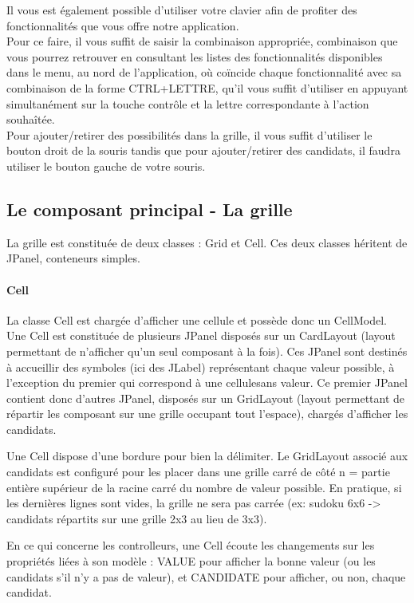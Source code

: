 Il vous est également possible d'utiliser votre clavier afin de profiter 
des fonctionnalités que vous offre notre application.\\
Pour ce faire, il vous suffit de saisir la combinaison appropriée, combinaison 
que vous pourrez retrouver en consultant les listes des fonctionnalités disponibles dans le menu, 
au nord de l'application, où coïncide chaque fonctionnalité avec sa combinaison 
de la forme CTRL+LETTRE, qu'il vous suffit d'utiliser en appuyant simultanément 
sur la touche contrôle et la lettre correspondante à l'action souhaîtée. \\

Pour ajouter/retirer des possibilités dans la grille, il vous suffit d'utiliser 
le bouton droit de la souris tandis que pour ajouter/retirer des candidats, il 
faudra utiliser le bouton gauche de votre souris.

\subsection{Le composant principal - La grille}

La grille est constituée de deux classes : Grid et Cell.
Ces deux classes héritent de JPanel, conteneurs simples.

\paragraph{Cell}
    
La classe Cell est chargée d'afficher une cellule et possède donc un CellModel.
Une Cell est constituée de plusieurs JPanel disposés sur un CardLayout (layout
permettant de n'afficher qu'un seul composant à la fois). Ces JPanel sont
destinés à accueillir des symboles (ici des JLabel) représentant chaque valeur
possible, à l'exception du premier qui correspond à une cellulesans valeur.
Ce premier JPanel contient donc d'autres JPanel, disposés sur un GridLayout
(layout permettant de répartir les composant sur une grille occupant tout l'espace),
chargés d'afficher les candidats.

Une Cell dispose d'une bordure pour bien la délimiter.
Le GridLayout associé aux candidats est configuré pour les placer dans une grille
carré de côté n = partie entière supérieur de la racine carré du nombre de valeur
possible. En pratique, si les dernières lignes sont vides, la grille ne sera pas
carrée (ex: sudoku 6x6 -> candidats répartits sur une grille 2x3 au lieu de 3x3).

En ce qui concerne les controlleurs, une Cell écoute les changements sur les
propriétés liées à son modèle : VALUE pour afficher la bonne valeur (ou les
candidats s'il n'y a pas de valeur), et CANDIDATE pour afficher, ou non, chaque
candidat.

